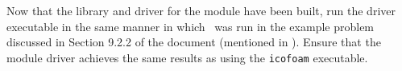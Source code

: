 
Now that the library and driver for the module have been built, run the driver executable in the same manner in which \icofoam\, was run in the example problem discussed in Section 9.2.2 of the  document (mentioned in ). Ensure that the module driver achieves the same results as using the \texttt{icofoam} executable.